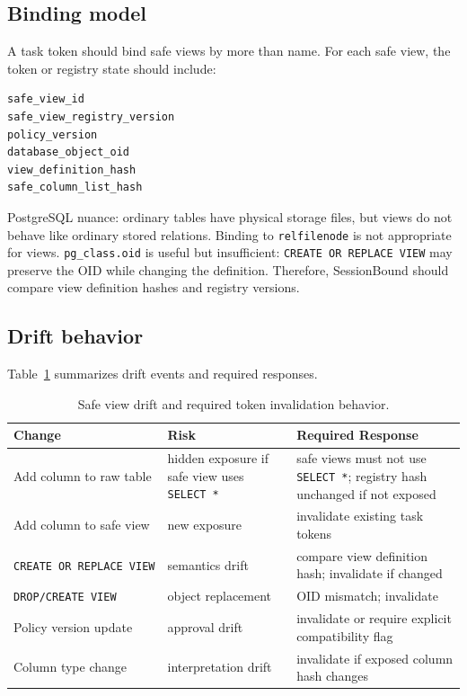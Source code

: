 \documentclass[journal]{IEEEtran}
\begin{document}
\hypertarget{binding-model}{%
\subsection{Binding model}\label{binding-model}}

A task token should bind safe views by more than name. For each safe
view, the token or registry state should include:

\begin{verbatim}
safe_view_id
safe_view_registry_version
policy_version
database_object_oid
view_definition_hash
safe_column_list_hash
\end{verbatim}

PostgreSQL nuance: ordinary tables have physical storage files, but
views do not behave like ordinary stored relations. Binding to
\texttt{relfilenode} is not appropriate for views.
\texttt{pg\_class.oid} is useful but insufficient:
\texttt{CREATE\ OR\ REPLACE\ VIEW} may preserve the OID while changing
the definition. Therefore, SessionBound should compare view definition
hashes and registry versions.

\hypertarget{drift-behavior}{%
\subsection{Drift behavior}\label{drift-behavior}}

Table~\ref{tab:schema-drift} summarizes drift events and required
responses.

\begin{table}[!t]
\centering
\small
\setlength{\tabcolsep}{3pt}
\caption{Safe view drift and required token invalidation behavior.}
\label{tab:schema-drift}
\begin{tabular}{@{}
  >{\raggedright\arraybackslash}p{}
  >{\raggedright\arraybackslash}p{}
  >{\raggedright\arraybackslash}p{}@{}}
\toprule
Change & Risk & Required Response \\
\midrule
Add column to raw table & hidden exposure if safe view uses
\texttt{SELECT\ *} & safe views must not use \texttt{SELECT\ *};
registry hash unchanged if not exposed \\
Add column to safe view & new exposure & invalidate existing task
tokens \\
\texttt{CREATE\ OR\ REPLACE\ VIEW} & semantics drift & compare view
definition hash; invalidate if changed \\
\texttt{DROP/CREATE\ VIEW} & object replacement & OID mismatch;
invalidate \\
Policy version update & approval drift & invalidate or require explicit
compatibility flag \\
Column type change & interpretation drift & invalidate if exposed column
hash changes \\
\bottomrule
\end{tabular}
\end{table}
\end{document}
